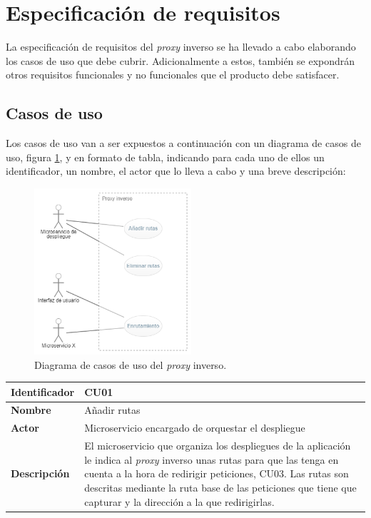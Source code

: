 \documentclass[11pt,spanish,listoffigures]{tfgetsinf}
\begin{document}

	\section{Especificación de requisitos} \label{especificacionRequisitos}

La especificación de requisitos del \emph{proxy} inverso se ha llevado a cabo elaborando los casos de uso que debe cubrir. Adicionalmente a estos, también se expondrán otros requisitos funcionales y no funcionales que el producto debe satisfacer.


		\subsection{Casos de uso} \label{casosDeUso}

Los casos de uso van a ser expuestos a continuación con un diagrama de casos de uso, figura \ref{diagramaCasosDeUso}, y en formato de tabla, indicando para cada uno de ellos un identificador, un nombre, el actor que lo lleva a cabo y una breve descripción:

\begin{figure}[ht]
\centering
\includegraphics[width=0.52\textwidth]{imagenes/diagramaCasosDeUso}
\caption{Diagrama de casos de uso del \emph{proxy} inverso.}
	\label{diagramaCasosDeUso}
\end{figure}

\begin{center} \begin{tabular}{| l | p{11.3cm} |}
\hline
\textbf{Identificador} & CU01
\\ \hline
\textbf{Nombre} & Añadir rutas
\\ \hline
\textbf{Actor} & Microservicio encargado de orquestar el despliegue
\\ \hline
\textbf{Descripción} & El microservicio que organiza los despliegues de la aplicación le indica al \emph{proxy} inverso unas rutas para que las tenga en cuenta a la hora de redirigir peticiones, CU03. Las rutas son descritas mediante la ruta base de las peticiones que tiene que capturar y la dirección a la que redirigirlas.
\\ \hline \end{tabular} \end{center}
\end{document}
